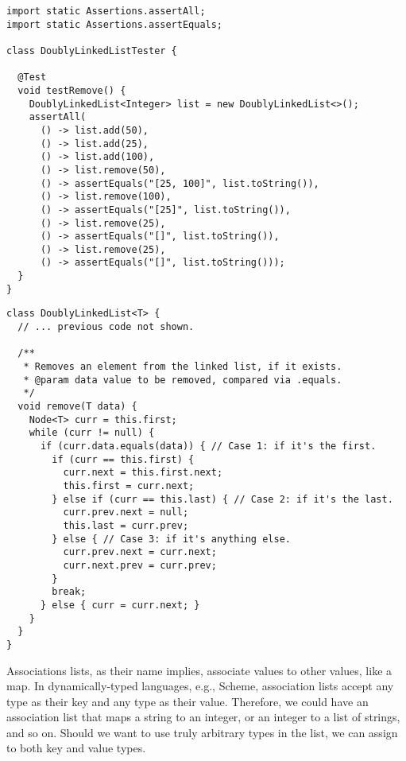 \begin{lstlisting}[language=MyJava]
import static Assertions.assertAll;
import static Assertions.assertEquals;

class DoublyLinkedListTester {

  @Test
  void testRemove() {
    DoublyLinkedList<Integer> list = new DoublyLinkedList<>();
    assertAll(
      () -> list.add(50),
      () -> list.add(25),
      () -> list.add(100),
      () -> list.remove(50),
      () -> assertEquals("[25, 100]", list.toString()),
      () -> list.remove(100),
      () -> assertEquals("[25]", list.toString()),
      () -> list.remove(25),
      () -> assertEquals("[]", list.toString()),
      () -> list.remove(25),
      () -> assertEquals("[]", list.toString()));
  }
}
\end{lstlisting}

\begin{lstlisting}[language=MyJava]
class DoublyLinkedList<T> {
  // ... previous code not shown.

  /**
   * Removes an element from the linked list, if it exists.
   * @param data value to be removed, compared via .equals.
   */
  void remove(T data) {
    Node<T> curr = this.first;
    while (curr != null) {
      if (curr.data.equals(data)) { // Case 1: if it's the first.
        if (curr == this.first) {
          curr.next = this.first.next;
          this.first = curr.next;
        } else if (curr == this.last) { // Case 2: if it's the last.
          curr.prev.next = null;
          this.last = curr.prev;
        } else { // Case 3: if it's anything else.
          curr.prev.next = curr.next;
          curr.next.prev = curr.prev;
        }
        break;
      } else { curr = curr.next; }
    }
  }
}
\end{lstlisting}

\newpage
{}

Associations lists, as their name implies, associate values to other values, like a map. In dynamically-typed languages, e.g., Scheme, association lists accept any type as their key and any type as their value. Therefore, we could have an association list that maps a string to an integer, or an integer to a list of strings, and so on. Should we want to use truly arbitrary types in the list, we can assign  to both key and value types.

